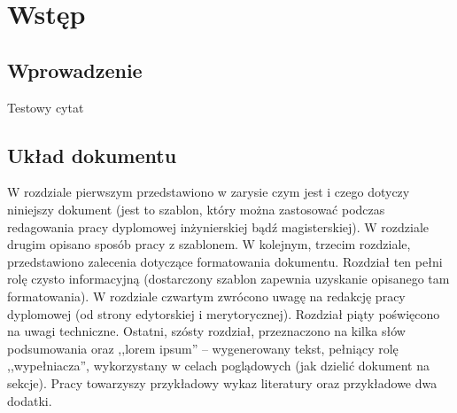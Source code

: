 \chapter{Wstęp}
\section{Wprowadzenie}
Testowy cytat \cite{SQL2}

\section{Układ dokumentu}
W rozdziale pierwszym przedstawiono w zarysie czym jest i czego dotyczy niniejszy dokument (jest to szablon, który można zastosować podczas redagowania pracy dyplomowej inżynierskiej bądź magisterskiej). W rozdziale drugim opisano sposób pracy z szablonem. W kolejnym, trzecim rozdziale, przedstawiono zalecenia dotyczące formatowania dokumentu. Rozdział ten pełni rolę czysto informacyjną (dostarczony szablon zapewnia uzyskanie opisanego tam formatowania). W rozdziale czwartym zwrócono uwagę na redakcję pracy dyplomowej (od strony edytorskiej i merytorycznej). Rozdział piąty poświęcono na uwagi techniczne. Ostatni, szósty rozdział, przeznaczono na kilka słów podsumowania oraz ,,lorem ipsum'' -- wygenerowany tekst, pełniący rolę ,,wypełniacza'', wykorzystany w celach poglądowych (jak dzielić dokument na sekcje). Pracy towarzyszy przykładowy wykaz literatury oraz przykładowe dwa dodatki.